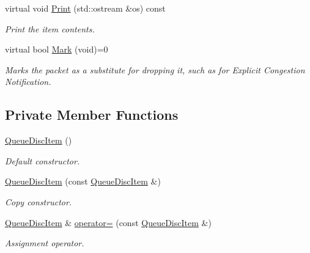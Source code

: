 \begin{DoxyCompactItemize}
virtual void \hyperlink{classns3_1_1QueueDiscItem_ade009bbe42f262c76d68a8530e207762}{Print} (std\+::ostream \&os) const 
\begin{DoxyCompactList}\small\item\em Print the item contents. \end{DoxyCompactList}\item 
virtual bool \hyperlink{classns3_1_1QueueDiscItem_aa579dc2545fa8c8d93103cf39d125e2f}{Mark} (void)=0
\begin{DoxyCompactList}\small\item\em Marks the packet as a substitute for dropping it, such as for Explicit Congestion Notification. \end{DoxyCompactList}\end{DoxyCompactItemize}
\subsection*{Private Member Functions}
\begin{DoxyCompactItemize}
\item 
\hyperlink{classns3_1_1QueueDiscItem_a795158405b6cf0be79ff70011d8b00ba}{Queue\+Disc\+Item} ()
\begin{DoxyCompactList}\small\item\em Default constructor. \end{DoxyCompactList}\item 
\hyperlink{classns3_1_1QueueDiscItem_afcad5c073fc8e3fa6f25fc450b9d0e24}{Queue\+Disc\+Item} (const \hyperlink{classns3_1_1QueueDiscItem}{Queue\+Disc\+Item} \&)
\begin{DoxyCompactList}\small\item\em Copy constructor. \end{DoxyCompactList}\item 
\hyperlink{classns3_1_1QueueDiscItem}{Queue\+Disc\+Item} \& \hyperlink{classns3_1_1QueueDiscItem_a4a557943f8a05f6f226e7061e6a32485}{operator=} (const \hyperlink{classns3_1_1QueueDiscItem}{Queue\+Disc\+Item} \&)
\begin{DoxyCompactList}\small\item\em Assignment operator. \end{DoxyCompactList}\end{DoxyCompactItemize}
